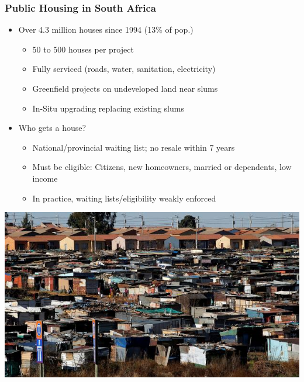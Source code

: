 \documentclass[aspectratio=149]{beamer}
\begin{document}
\begin{frame}
\frametitle{Public Housing in South Africa}
  \begin{itemize}
      \item Over 4.3 million houses since 1994 (13\% of pop.)
      \begin{itemize}
        \item 50 to 500 houses per project
        \item Fully serviced (roads, water, sanitation, electricity)
        \item Greenfield projects on undeveloped land near slums
        \item In-Situ upgrading replacing existing slums
      \end{itemize}
    \vspace{.1cm}
    \item Who gets a house?
      \begin{itemize}
        \item National/provincial waiting list; no resale within 7 years
        \item Must be eligible: Citizens, new homeowners, married or dependents, low income
        \item In practice, waiting lists/eligibility weakly enforced
      \end{itemize}
  \end{itemize}


\begin{center}
\includegraphics[scale=1]{slum_rdp.jpeg}
\end{center}

\end{frame}
\end{document}
